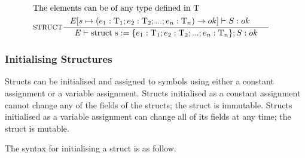 %

\begin{align*}
\intertext{The elements can be of any type defined in $\Tt$}
&\inference[STRUCT]{E[s \mapsto (e_1:\Tt_1;e_2:\Tt_2;...;e_n:\Tt_n) \rightarrow ok]\vdash S : ok & }
                 {\Tenv \mathbin{\text{struct s}} := \{e_1:\Tt_1;e_2:\Tt_2;...;e_n:\Tt_n\}; S: ok}
\end{align*}

\subsubsection{Initialising Structures}
\label{sec:initStructures}

Structs can be initialised and assigned to symbols using either a constant assignment or a variable assignment. Structs initialised as a constant assignment cannot change any of the fields of the structs; the struct is immutable. Structs initialised as a variable assignment can change all of its fields at any time; the struct is mutable.

The syntax for initialising a struct is as follow.

